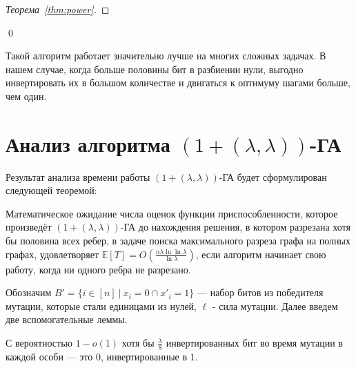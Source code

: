 \documentclass[times]{itmo-student-thesis}
\newcommand{\alglambdaf}{${(1 + (\lambda , \lambda))}$-ГА\xspace}
\newcommand{\ollga}{${(1 + (\lambda , \lambda))}$-ГА\xspace}
\begin{document}
\begin{proof}[Теорема~\ref{thm:power}]

\end{proof}\qed

Такой алгоритм работает значительно лучше на многих сложных задачах.
В нашем случае, когда больше половины бит в разбиении нули, выгодно инвертировать их в большом количестве и двигаться к оптимуму шагами больше, чем один.

\section{Анализ алгоритма \alglambdaf}
Результат анализа времени работы \alglambdaf будет сформулирован следующей теоремой:

\begin{theorem} \label{thm:time}
    Математическое ожидание числа оценок функции приспособленности, которое произведёт \ollga до нахождения решения, в котором разрезана хотя бы половина всех ребер, в задаче поиска максимального разреза графа на полных графах, удовлетворяет $\mathbb{E}[T]=O(\frac{n\lambda \ln \ln \lambda}{ \ln \lambda})$, если алгоритм начинает свою работу, когда ни одного ребра не разрезано.
\end{theorem}

Обозначим $B' = \{i \in [n] ~|~ x_i = 0 \cap x'_i = 1\}$ --- набор битов из победителя мутации, которые стали единицами из нулей,
$\ell$ - сила мутации. Далее введем две вспомогательные леммы.

\begin{lemma}\label{lem:mut1}
С вероятностью $1- o(1)$ хотя бы $\frac{\lambda}{8}$ инвертированных бит во время мутации в каждой особи --- это $0$, инвертированные в $1$.
\end{lemma}
\end{document}
